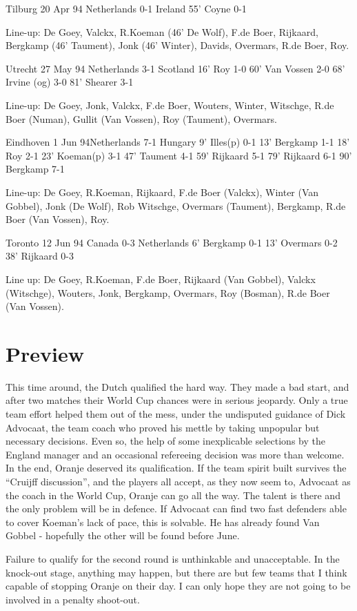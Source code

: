 Tilburg      20 Apr 94        Netherlands 0-1 Ireland   
55' Coyne 0-1

Line-up:  De Goey, Valckx, R.Koeman (46' De Wolf), F.de Boer, Rijkaard, 
 Bergkamp (46' Taument), Jonk (46' Winter), Davids, Overmars, 
 R.de Boer, Roy.

Utrecht      27 May 94        Netherlands 3-1 Scotland 
16' Roy 1-0  60' Van Vossen 2-0  68' Irvine (og) 3-0  81' Shearer 3-1

Line-up:  De Goey, Jonk, Valckx, F.de Boer, Wouters, Winter, Witschge, 
 R.de Boer (Numan), Gullit (Van Vossen), Roy (Taument), Overmars.

Eindhoven    1 Jun 94Netherlands 7-1 Hungary  
9' Illes(p) 0-1 13' Bergkamp 1-1  18' Roy 2-1  23' Koeman(p) 3-1  47' Taument 4-1
59' Rijkaard 5-1  79' Rijkaard 6-1  90' Bergkamp 7-1

Line-up:  De Goey, R.Koeman, Rijkaard, F.de Boer (Valckx), Winter (Van Gobbel),
 Jonk (De Wolf), Rob Witschge, Overmars (Taument), Bergkamp, 
 R.de Boer (Van Vossen), Roy.

Toronto      12 Jun 94        Canada      0-3  Netherlands
6' Bergkamp 0-1  13' Overmars 0-2  38' Rijkaard 0-3

Line up: De Goey, R.Koeman, F.de Boer, Rijkaard (Van Gobbel), 
Valckx (Witschge), Wouters, Jonk, Bergkamp, Overmars, Roy (Bosman), 
R.de Boer (Van Vossen).
\section{Preview}
This time around, the Dutch qualified the hard way. They made a bad start, and 
after two matches their World Cup chances were in serious jeopardy. Only a 
true team effort helped them out of the mess, under the undisputed guidance of 
Dick Advocaat, the team coach who proved his mettle by taking unpopular but 
necessary decisions. Even so, the help of some inexplicable selections by the 
England manager and an occasional refereeing decision was more than welcome. 
In the end, Oranje deserved its qualification. If the team spirit built 
survives the ``Cruijff discussion'', and the players all accept, as they now seem 
to, Advocaat as the coach in the World Cup, Oranje can go all the way. The 
talent is there and the only problem will be in defence. If Advocaat can find 
two fast defenders able to cover Koeman's lack of pace, this is solvable. He has
already found Van Gobbel - hopefully the other will be found before June.

Failure to qualify for the second round is unthinkable and unacceptable. In
the knock-out stage, anything may happen, but there are but few teams that I
think capable of stopping Oranje on their day. I can only hope they are not
going to be involved in a penalty shoot-out.
